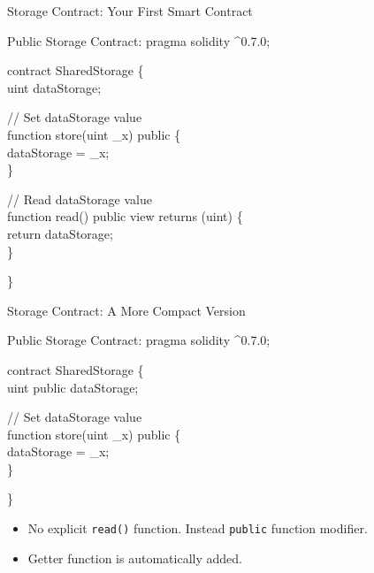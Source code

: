 \documentclass[]{beamer}
\begin{document}
\begin{frame}{Storage Contract: Your First Smart Contract}
	\begin{samplecode}{Public Storage Contract:}
		pragma solidity \^{}0.7.0;\\
		\hfill
		
		contract SharedStorage \{ \\
		\hphantom{~~~~}uint dataStorage;\\
		\hfill
		
		\hphantom{~~~~}\textcolor{softanthracite}{// Set dataStorage value}\\
		\hphantom{~~~~}function \textcolor{focus}{store}(uint \_x) public \{ \\
			\hphantom{~~~~~~~~}dataStorage = \_x;\\
		\hphantom{~~~~}\} \\
		\hfill
		
		\hphantom{~~~~}\textcolor{softanthracite}{// Read dataStorage value}\\
		\hphantom{~~~~}function \textcolor{focus}{read}() public view returns (uint) \{ \\
			\hphantom{~~~~~~~~}return dataStorage;\\
			\hphantom{~~~~}\} \\
			\hfill
			
		\}
	\end{samplecode}
\end{frame}

\begin{frame}{Storage Contract: A More Compact Version}
	\begin{samplecode}{Public Storage Contract:}
		pragma solidity \^{}0.7.0;\\
		\hfill
		
		contract SharedStorage \{ \\
		\hphantom{~~~~}uint public dataStorage;\\
		\hfill
		
		\hphantom{~~~~}\textcolor{softanthracite}{// Set dataStorage value}\\
		\hphantom{~~~~}function \textcolor{focus}{store}(uint \_x) public \{ \\
			\hphantom{~~~~~~~~}dataStorage = \_x;\\
		\hphantom{~~~~}\} \\
		\hfill
		
		\}
	\end{samplecode}
	
	\begin{itemize}
		\item No explicit \texttt{\textcolor{focus}{read}()} function. Instead \texttt{public} function modifier.
		\item Getter function is automatically added.	
	\end{itemize}
\end{frame}
\end{document}
